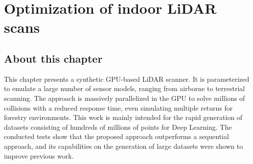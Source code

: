 \setchapterpreamble[u]{\margintoc}
\chapter{Optimization of indoor LiDAR scans}
\label{sec:lidar_optimization}

\section*{About this chapter}

This chapter presents a synthetic GPU-based LiDAR scanner. It is parameterized to emulate a large number of sensor models, ranging from airborne to terrestrial scanning. The approach is massively parallelized in the GPU to solve millions of collisions with a reduced response time, even simulating multiple returns for forestry environments. This work is mainly intended for the rapid generation of datasets consisting of hundreds of millions of points for Deep Learning. The conducted tests show that the proposed approach outperforms a sequential approach, and its capabilities on the generation of large datasets were shown to improve previous work. 

